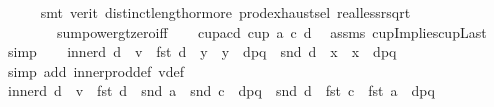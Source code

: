 \begin{isabellebody}
\ \ \ \ \isamarkupfalse%
\ {\isacharparenleft}{\kern0pt}smt\ {\isacharparenleft}{\kern0pt}verit{\isacharparenright}{\kern0pt}\ distinct{\isacharunderscore}{\kern0pt}length{\isacharunderscore}{\kern0pt}{}{\isacharunderscore}{\kern0pt}or{\isacharunderscore}{\kern0pt}more\ prod{\isachardot}{\kern0pt}exhaust{\isacharunderscore}{\kern0pt}sel\ real{\isacharunderscore}{\kern0pt}less{\isacharunderscore}{\kern0pt}rsqrt\isanewline
\ \ \ \ \ \ \ \ sum{\isacharunderscore}{\kern0pt}power{}{\isacharunderscore}{\kern0pt}gt{\isacharunderscore}{\kern0pt}zero{\isacharunderscore}{\kern0pt}iff{\isacharparenright}{\kern0pt}\isanewline
\ \ \isamarkupfalse%
\ cup{\isacharunderscore}{\kern0pt}acd{\isacharcolon}{\kern0pt}\ {\isachardoublequoteopen}cup{}\ a\ c\ d{\isachardoublequoteclose}\ \isamarkupfalse%
\ assms\ cup{}Impliescup{}Last\ \isamarkupfalse%
\ simp\isanewline
\ \ \isamarkupfalse%
\ inner{\isacharunderscore}{\kern0pt}d{}{\isacharcolon}{\kern0pt}\ {\isachardoublequoteopen}d\ {\isasymbullet}\ v\ {\isacharequal}{\kern0pt}\ {\isacharparenleft}{\kern0pt}fst\ d\ {\isacharasterisk}{\kern0pt}\ {\isacharparenleft}{\kern0pt}{\isacharparenleft}{\kern0pt}y{}\ {\isacharminus}{\kern0pt}\ y{}{\isacharparenright}{\kern0pt}\ {\isacharslash}{\kern0pt}\ dpq{\isacharparenright}{\kern0pt}{\isacharparenright}{\kern0pt}\ {\isacharplus}{\kern0pt}\ {\isacharparenleft}{\kern0pt}snd\ d\ {\isacharasterisk}{\kern0pt}\ {\isacharparenleft}{\kern0pt}x{}\ {\isacharminus}{\kern0pt}\ x{}{\isacharparenright}{\kern0pt}\ {\isacharslash}{\kern0pt}\ dpq{\isacharparenright}{\kern0pt}{\isachardoublequoteclose}\isanewline
\ \ \ \ \ \ \isamarkupfalse%
\ {\isacharparenleft}{\kern0pt}simp\ add{\isacharcolon}{\kern0pt}\ inner{\isacharunderscore}{\kern0pt}prod{\isacharunderscore}{\kern0pt}def\ v{\isacharunderscore}{\kern0pt}def{\isacharparenright}{\kern0pt}\isanewline
\ \ \isamarkupfalse%
\ inner{\isacharunderscore}{\kern0pt}d{}{\isacharcolon}{\kern0pt}\ {\isachardoublequoteopen}d\ {\isasymbullet}\ v\ {\isacharequal}{\kern0pt}\ {\isacharparenleft}{\kern0pt}fst\ d\ {\isacharasterisk}{\kern0pt}\ {\isacharparenleft}{\kern0pt}{\isacharparenleft}{\kern0pt}snd\ a\ {\isacharminus}{\kern0pt}\ snd\ c{\isacharparenright}{\kern0pt}\ {\isacharslash}{\kern0pt}\ dpq{\isacharparenright}{\kern0pt}{\isacharparenright}{\kern0pt}\ {\isacharplus}{\kern0pt}\ {\isacharparenleft}{\kern0pt}snd\ d\ {\isacharasterisk}{\kern0pt}\ {\isacharparenleft}{\kern0pt}fst\ c\ {\isacharminus}{\kern0pt}\ fst\ a{\isacharparenright}{\kern0pt}\ {\isacharslash}{\kern0pt}\ dpq{\isacharparenright}{\kern0pt}{\isachardoublequoteclose}\isanewline

\end{isabellebody}

